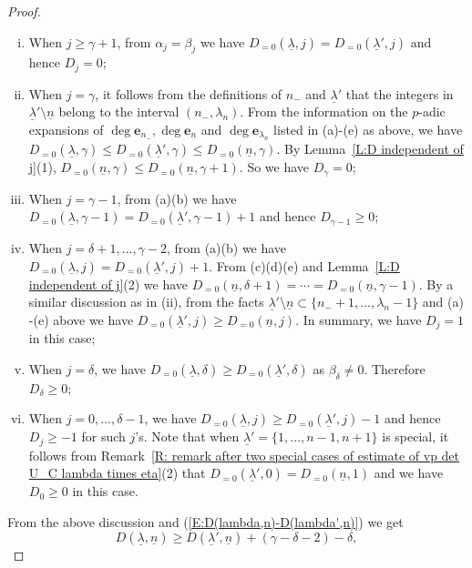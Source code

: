 \documentclass[12pt]{amsart}
\theoremstyle{definition}
\numberwithin{equation}{subsection}
\def\bfe{\mathbf{e}}
\begin{document}
\begin{proof}
\begin{enumerate}[(i)]
			\item When $j\geq \gamma+1$, from $\alpha_j=\beta_j$ we have $D_{=0}(\underline \lambda ,j)=D_{=0}(\underline \lambda',j)$ and hence $D_j=0$;
			\item When $j=\gamma$, it follows from the definitions of $n_-$ and $\underline \lambda'$ that the integers in $\underline \lambda'\setminus \underline n$ belong to the interval $(n_-,\lambda_n)$. From the information on the $p$-adic expansions of $\deg \bfe_{n_-}, \deg \bfe_n$ and $\deg \bfe_{\lambda_n}$ listed in (a)$\mbox{-}$(e) as above, we have $D_{=0}(\underline \lambda, \gamma)\leq D_{=0}(\underline \lambda',\gamma)\leq D_{=0}(\underline n, \gamma)$. By Lemma~\ref{L:D independent of j}(1), $D_{=0}(\underline n,\gamma)\leq D_{=0}(\underline n, \gamma+1)$. So we have $D_\gamma=0$;
			\item When $j=\gamma-1$, from (a)(b) we have $D_{=0}(\underline \lambda,\gamma-1)=D_{=0}(\underline \lambda', \gamma-1)+1$ and hence $D_{\gamma-1}\geq 0$;
			\item When $j=\delta+1,\dots, \gamma-2$, from (a)(b) we have $D_{=0}(\underline \lambda, j)=D_{=0}(\underline \lambda',j)+1$. From (c)(d)(e) and Lemma~\ref{L:D independent of j}(2) we have $D_{=0}(\underline n, \delta+1)=\cdots =D_{=0}(\underline n, \gamma-1)$. By a similar discussion as in (ii), from the facts $\underline\lambda'\setminus \underline n\subset \{n_-+1,\dots, \lambda_n-1 \}$ and (a)$\mbox{-}$(e) above we have $D_{=0}(\underline \lambda', j)\geq D_{=0}(\underline n,j)$. In summary, we have $D_j=1$ in this case;
			\item When $j=\delta$, we have $D_{=0}(\underline \lambda, \delta)\geq D_{=0}(\underline \lambda',\delta)$ as $\beta_\delta\neq 0$. Therefore $D_{\delta}\geq 0$;
			\item When $j=0,\dots, \delta-1$, we have $D_{=0}(\underline \lambda, j)\geq D_{=0}(\underline \lambda',j)-1$ and hence $D_j\geq -1$ for such $j$'s. Note that when $\underline\lambda'=\{1,\dots, n-1,n+1\}$ is special, it follows from Remark~\ref{R: remark after two special cases of estimate of vp det U_C lambda times eta}(2) that $D_{=0}(\underline \lambda',0)=D_{=0}(\underline n, 1)$ and we have $D_0\geq 0$ in this case.
		\end{enumerate}
		From the above discussion and (\ref{E:D(lambda,n)-D(lambda',n)}) we get 
		\begin{equation}
			\label{E:Dlambda -Dlambda'}
			D(\underline \lambda,\underline n) \geq D(\underline \lambda', \underline n) + (\gamma-\delta-2) - \delta,

\end{equation}
\end{proof}
\end{document}
